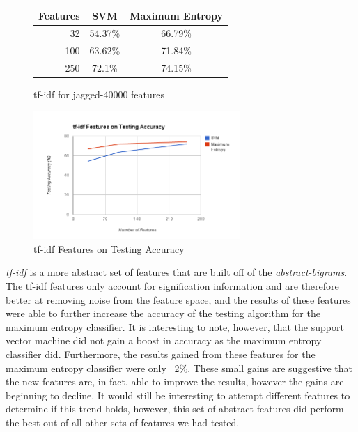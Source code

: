 \begin{figure}[!h]
\begin{center}
\caption{tf-idf for jagged-40000 features}
\begin{tabular}{| r | c | c |}
\hline
\textbf{Features} & \textbf{SVM} & \textbf{Maximum Entropy} \\ \hline
32 & 54.37\% & 66.79\% \\ \hline
100 & 63.62\% & 71.84\% \\ \hline
250 & 72.1\% & 74.15\% \\ \hline
\end{tabular}
\end{center}
\end{figure}

\begin{figure}[!h]
\begin{center}
\caption{tf-idf Features on Testing Accuracy}
\includegraphics[width=0.7\textwidth]{tfidf.png}
\end{center}
\end{figure}

\emph{tf-idf} is a more abstract set of features that are built off of the \emph{abstract-bigrams}.  The tf-idf features only account for signification information and are therefore better at removing noise from the feature space, and the results of these features were able to further increase the accuracy of the testing algorithm for the maximum entropy classifier.  It is interesting to note, however, that the support vector machine did not gain a boost in accuracy as the maximum entropy classifier did.  Furthermore, the results gained from these features for the maximum entropy classifier were only ~2\%.  These small gains are suggestive that the new features are, in fact, able to improve the results, however the gains are beginning to decline.  It would still be interesting to attempt different features to determine if this trend holds, however, this set of abstract features did perform the best out of all other sets of features we had tested.

